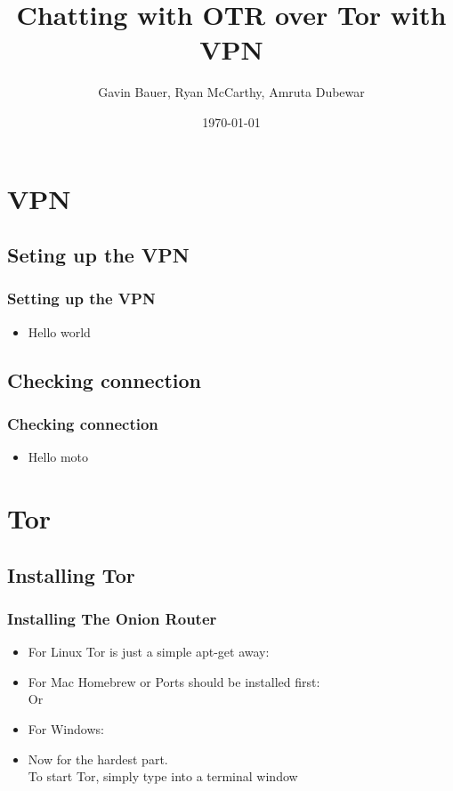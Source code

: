 \documentclass{beamer}
\title{Chatting with OTR over Tor with VPN}
\author{Gavin Bauer, Ryan McCarthy, Amruta Dubewar}
\date{\today}
\begin{document}
\begin{frame}
\maketitle
\end{frame}
\section{VPN}
\subsection{Seting up the VPN}
\begin{frame}
\frametitle{Setting up the VPN}
\begin{itemize}
\item Hello world
\end{itemize}
\end{frame}
\subsection{Checking connection}
\begin{frame}
\frametitle{Checking connection}
\begin{itemize}
\item Hello moto
\end{itemize}
\end{frame}


\section{Tor}
\subsection{Installing Tor}
\begin{frame}
\frametitle{Installing The Onion Router}
\begin{itemize}
\item For Linux Tor is just a simple apt-get away:\\

{\color{blue}{sudo apt-get install tor}}

\item For Mac Homebrew or Ports should be installed first:\\
{\color{blue}{brew install tor}} Or {\color{blue}{ports install tor}}

\item For Windows:

{\color{red}{You're on your own...}}

\item Now for the hardest part. \\To start Tor, simply type {\color{blue}{tor}} into a terminal window

\end{itemize}
\end{frame}
\end{document}
